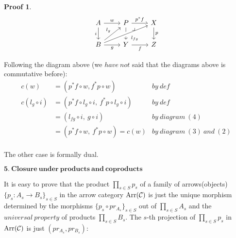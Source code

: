\documentclass[a4paper]{article}
\theoremstyle{plain}
\theoremstyle{definition}
\newtheorem*{prf}{Proof}
\theoremstyle{remark}
\newcommand{\mc}[1]{\mathcal{#1}}
\newcommand{\mbf}[1]{\mathbf{#1}}
\newcommand{\mcC}{\mc C}
\DeclareMathOperator{\Arr}{\rm{Arr}}
\begin{document}
\begin{prf}
            \[\begin{tikzcd}
                A & P & X \\
                B & Y & Z
                \arrow["{l_{g}}", from=2-1, to=1-2]
                \arrow["{i }"', from=1-1, to=2-1]
                \arrow["w", from=1-1, to=1-2]
                \arrow[from=1-2, to=2-2]
                \arrow["{p^*f}", from=1-2, to=1-3]
                \arrow["p", from=1-3, to=2-3]
                \arrow["f"', from=2-2, to=2-3]
                \arrow["g"', from=2-1, to=2-2]
                \arrow["{\ \ \! l_{fg}}"', from=2-1, to=1-3, crossing over]
                \arrow["{\big \lrcorner}"{anchor=center, pos=0.125}, draw=none, from=1-2, to=2-3]
            \end{tikzcd}\]

            \par Following the diagram above (we $have\ not$ said that the diagrams above is commutative before):
            \begin{align*}
                c(w) &= (p^*f \circ w, f^*p \circ w) & by\ def\\
                c(l_g \circ i) &= (p^*f \circ l_g \circ i,\ f^*p \circ l_g \circ i) & by\ def\\
                &= (l_{fg} \circ i,\ g \circ i)  & by\ diagram\ (4)\\
                &= (p^*f \circ w,\ f^*p \circ w) = c(w) & by\ diagram\ (3)\ and\ (2)\\
            \end{align*}

            \par The other case is formally dual.\\

        \par $\mbf{5.\ Closure\ under\ products\ and\ coproducts}$\\

            \par It is easy to prove that the product $\prod\limits_{s \in S} p_s$ of
            a family of arrows(objects) $\{p_s : A_s \to B_s\}_{s \in S}$ in the arrow category
            $\Arr(\mcC)$ is just the unique morphism determined by
            the morphisms $\{ p_s \circ pr_{A_s} \}_{s \in S}$ out of $\prod\limits_{s \in S} A_s$
            and the  $universal\ property$ of products $\prod\limits_{s \in S} B_s$.
            The $s$-th projection of $\prod\limits_{s \in S} p_s$ in $\Arr(\mcC)$ is just $(pr_{A_s}, pr_{B_s})$:


\end{prf}
\end{document}
